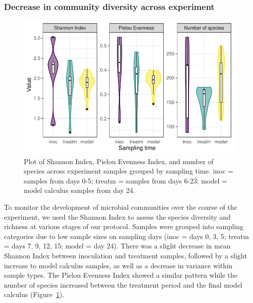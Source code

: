 \documentclass[
  b5paper,
]{book}
\begin{document}
\hypertarget{decrease-in-community-diversity-across-experiment}{%
\subsubsection{Decrease in community diversity across
experiment}\label{decrease-in-community-diversity-across-experiment}}

\begin{figure}

{\centering \includegraphics{figures/byoc-valid-fig-diversity-byoc-1.pdf}

}

\caption{\label{fig-diversity-byoc}Plot of Shannon Index, Pielou
Evenness Index, and number of species across experiment samples grouped
by sampling time. inoc = samples from days 0-5; treatm = samples from
days 6-23; model = model calculus samples from day 24.}

\end{figure}

To monitor the development of microbial communities over the course of
the experiment, we used the Shannon Index to assess the species
diversity and richness at various stages of our protocol. Samples were
grouped into sampling categories due to low sample sizes on sampling
days (inoc = days 0, 3, 5; treatm = days 7, 9, 12, 15; model = day 24).
There was a slight decrease in mean Shannon Index between inoculation
and treatment samples, followed by a slight increase to model calculus
samples, as well as a decrease in variance within sample types. The
Pielou Evenness Index showed a similar pattern while the number of
species increased between the treatment period and the final model
calculus (Figure~\ref{fig-diversity-byoc}).
\end{document}
